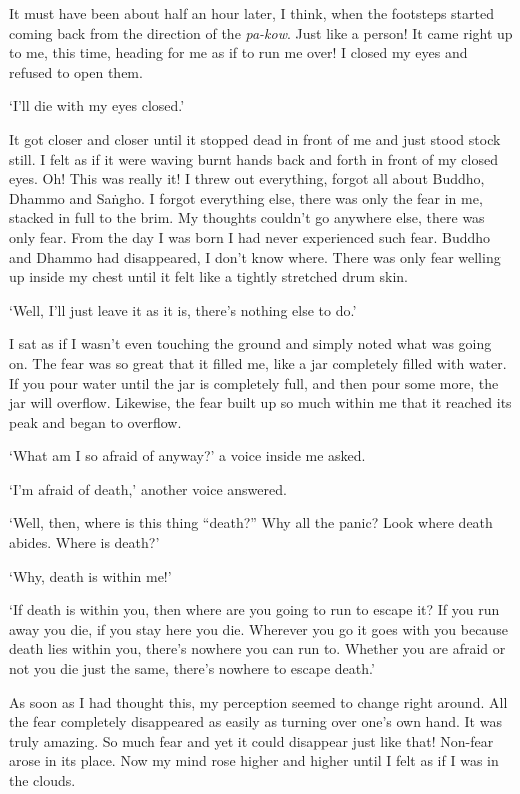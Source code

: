 It must have been about half an hour later, I think, when the footsteps started coming back from the direction of the \textit{pa-kow}. Just like a person! It came right up to me, this time, heading for me as if to run me over! I closed my eyes and refused to open them. 

`I'll die with my eyes closed.' 

It got closer and closer until it stopped dead in front of me and just stood stock still. I felt as if it were waving burnt hands back and forth in front of my closed eyes. Oh! This was really it! I threw out everything, forgot all about Buddho, Dhammo and Sa\.ngho. I forgot everything else, there was only the fear in me, stacked in full to the brim. My thoughts couldn't go anywhere else, there was only fear. From the day I was born I had never experienced such fear. Buddho and Dhammo had disappeared, I don't know where. There was only fear welling up inside my chest until it felt like a tightly stretched drum skin. 

`Well, I'll just leave it as it is, there's nothing else to do.' 

I sat as if I wasn't even touching the ground and simply noted what was going on. The fear was so great that it filled me, like a jar completely filled with water. If you pour water until the jar is completely full, and then pour some more, the jar will overflow. Likewise, the fear built up so much within me that it reached its peak and began to overflow. 

`What am I so afraid of anyway?' a voice inside me asked. 

`I'm afraid of death,' another voice answered. 

`Well, then, where is this thing ``death?'' Why all the panic? Look where death abides. Where is death?' 

`Why, death is within me!' 

`If death is within you, then where are you going to run to escape it? If you run away you die, if you stay here you die. Wherever you go it goes with you because death lies within you, there's nowhere you can run to. Whether you are afraid or not you die just the same, there's nowhere to escape death.' 

As soon as I had thought this, my perception seemed to change right around. All the fear completely disappeared as easily as turning over one's own hand. It was truly amazing. So much fear and yet it could disappear just like that! Non-fear arose in its place. Now my mind rose higher and higher until I felt as if I was in the clouds. 

